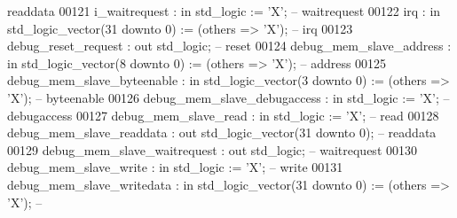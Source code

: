 \begin{DoxyCode}
{       readdata}
00121             i\_waitrequest                       : \textcolor{keywordflow}{in}  \textcolor{comment}{std\_logic}                     := 'X';             \textcolor{keyword}{--
       waitrequest}
00122             irq                                 : \textcolor{keywordflow}{in}  \textcolor{comment}{std\_logic\_vector}(\textcolor{vhdllogic}{}\textcolor{vhdllogic}{31} \textcolor{keywordflow}{downto} \textcolor{vhdllogic}{}\textcolor{vhdllogic}{0}) := (\textcolor{keywordflow}{others} => 'X'); \textcolor{keyword}{--
       irq}
00123             debug\_reset\_request                 : \textcolor{keywordflow}{out} \textcolor{comment}{std\_logic};                                        \textcolor{keyword}{--
       reset}
00124             debug\_mem\_slave\_address             : \textcolor{keywordflow}{in}  \textcolor{comment}{std\_logic\_vector}(\textcolor{vhdllogic}{}\textcolor{vhdllogic}{8} \textcolor{keywordflow}{downto} \textcolor{vhdllogic}{}\textcolor{vhdllogic}{0})  := (\textcolor{keywordflow}{others} => 'X'); \textcolor{keyword}{--
       address}
00125             debug\_mem\_slave\_byteenable          : \textcolor{keywordflow}{in}  \textcolor{comment}{std\_logic\_vector}(\textcolor{vhdllogic}{}\textcolor{vhdllogic}{3} \textcolor{keywordflow}{downto} \textcolor{vhdllogic}{}\textcolor{vhdllogic}{0})  := (\textcolor{keywordflow}{others} => 'X'); \textcolor{keyword}{--
       byteenable}
00126             debug\_mem\_slave\_debugaccess         : \textcolor{keywordflow}{in}  \textcolor{comment}{std\_logic}                     := 'X';             \textcolor{keyword}{--
       debugaccess}
00127             debug\_mem\_slave\_read                : \textcolor{keywordflow}{in}  \textcolor{comment}{std\_logic}                     := 'X';             \textcolor{keyword}{--
       read}
00128             debug\_mem\_slave\_readdata            : \textcolor{keywordflow}{out} \textcolor{comment}{std\_logic\_vector}(\textcolor{vhdllogic}{}\textcolor{vhdllogic}{31} \textcolor{keywordflow}{downto} \textcolor{vhdllogic}{}\textcolor{vhdllogic}{0});                    \textcolor{keyword}{--
       readdata}
00129             debug\_mem\_slave\_waitrequest         : \textcolor{keywordflow}{out} \textcolor{comment}{std\_logic};                                        \textcolor{keyword}{--
       waitrequest}
00130             debug\_mem\_slave\_write               : \textcolor{keywordflow}{in}  \textcolor{comment}{std\_logic}                     := 'X';             \textcolor{keyword}{--
       write}
00131             debug\_mem\_slave\_writedata           : \textcolor{keywordflow}{in}  \textcolor{comment}{std\_logic\_vector}(\textcolor{vhdllogic}{}\textcolor{vhdllogic}{31} \textcolor{keywordflow}{downto} \textcolor{vhdllogic}{}\textcolor{vhdllogic}{0}) := (\textcolor{keywordflow}{others} => 'X'); \textcolor{keyword}{--
}
\end{DoxyCode}
